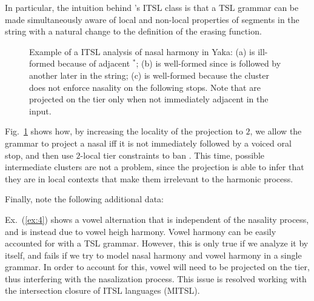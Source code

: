 \documentclass[11pt,a4paper]{article}
\begin{document}
In particular, the intuition behind  \citet{desanto2019structure}'s ITSL class is that  a TSL grammar  can be made simultaneously aware of local and non-local properties of segments in the string with a natural change to the definition of the erasing function.

\begin{figure}[]
\begin{center}
       
    
      
        \end{center}
        \caption{Example of a ITSL analysis of nasal harmony in Yaka: (a) is ill-formed because of adjacent $^*$\textipa{[nd]}; (b) is well-formed since  \textipa{[n]} is followed by another  \textipa{[n]} later in the string; (c) is well-formed because the \textipa{[nd]} cluster does not enforce nasality on the following stops.  Note that \textipa{[n,d]} are projected on the tier only when not immediately adjacent in the input. }
        \label{fig:YAKA2}
        \end{figure}


Fig.~\ref{fig:YAKA2} shows how, by increasing the locality of the projection to $2$, we allow the grammar to project a nasal iff it is not immediately followed by a voiced oral stop, and then use $2$-local tier constraints to ban  .%
This time,  possible intermediate clusters are not a problem, since the projection is able to infer that they are in local contexts that make them irrelevant to the harmonic process.

Finally, note the following additional data:


\begin{exe}
    \ex\label{ex:4}\begin{xlist}
    	 \ex\label{ex:4a}    
	 \ex\label{ex:4b} 
	\end{xlist}
\end{exe}

Ex.~(\ref{ex:4}) shows a vowel alternation that is independent of the nasality process, and is instead due to vowel heigh harmony.
Vowel harmony can be easily accounted for with a TSL grammar.
However, this is only true if we analyze it by itself, and fails if we try to model nasal harmony and vowel harmony in a single grammar.
In order to account for this, vowel will need to be projected on the tier, thus interfering with the nasalization process.
This issue is resolved working with the intersection closure of ITSL languages (MITSL).
\end{document}

